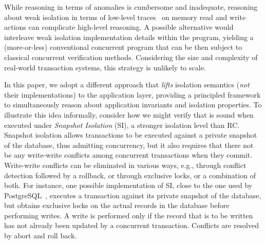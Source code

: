 While reasoning in terms of anomalies is cumbersome and inadequate,
reasoning about weak isolation in terms of low-level
traces~\cite{adyaphd,gotsmanconcur15} on memory read and write actions
can complicate high-level reasoning.  A possible alternative would
interleave weak isolation implementation details within the program,
yielding a (more-or-less) conventional concurrent program that can be
then subject to classical concurrent verification methods.
Considering the size and complexity of real-world transaction systems,
this strategy is unlikely to scale.

In this paper, we adopt a different approach that \emph{lifts}
isolation semantics (\emph{not} their implementations) to the
application layer, providing a principled framework to simultaneously
reason about application invariants and isolation properties.  To
illustrate this idea informally, consider how we might verify that
 is sound when executed under \emph{Snapshot Isolation}
(SI), a stronger isolation level than RC. Snapshot isolation allows
transactions to be executed against a private snapshot of the
database, thus admitting concurrency, but it also requires that there
not be any write-write conflicts among concurrent transactions when
they commit. Write-write conflicts can be eliminated in various ways,
e.g., through conflict detection followed by a rollback, or through
exclusive locks, or a combination of both.  For instance, one possible
implementation of SI, close to the one used by
PostgreSQL~\cite{postgres-ssi}, executes a transaction against its
private snapshot of the database, but obtains exclusive locks on the
actual records in the database before performing writes. A write is
performed only if the record that is to be written has not already
been updated by a concurrent transaction. Conflicts are resolved by
abort and roll back.



